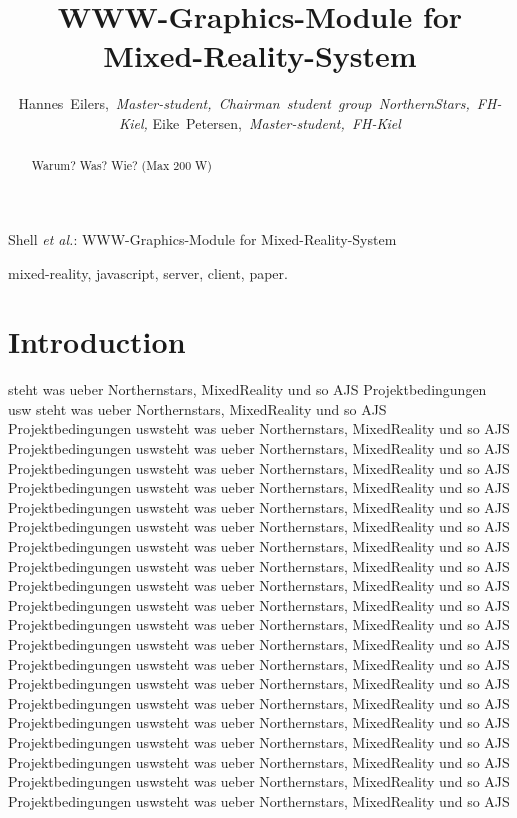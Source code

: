 \documentclass[journal]{IEEEtran}
\begin{document}
\title{WWW-Graphics-Module for Mixed-Reality-System}

\author{Hannes~Eilers,~\textit{Master-student,~Chairman~student~group~NorthernStars,~FH-Kiel,}
        Eike~Petersen,~\textit{Master-student,~FH-Kiel}}

%
{Shell \MakeLowercase{\textit{et al.}}: WWW-Graphics-Module for Mixed-Reality-System}

\maketitle

\begin{abstract}
	Warum? Was? Wie? (Max 200 W)
\end{abstract}
\begin{IEEEkeywords}
mixed-reality, javascript, server, client, paper.
\end{IEEEkeywords}

\section{Introduction}

 steht was ueber Northernstars, MixedReality und so AJS Projektbedingungen usw steht was ueber Northernstars, MixedReality und so AJS Projektbedingungen uswsteht was ueber Northernstars, MixedReality und so AJS Projektbedingungen uswsteht was ueber Northernstars, MixedReality und so AJS Projektbedingungen uswsteht was ueber Northernstars, MixedReality und so AJS Projektbedingungen uswsteht was ueber Northernstars, MixedReality und so AJS Projektbedingungen uswsteht was ueber Northernstars, MixedReality und so AJS Projektbedingungen uswsteht was ueber Northernstars, MixedReality und so AJS Projektbedingungen uswsteht was ueber Northernstars, MixedReality und so AJS Projektbedingungen uswsteht was ueber Northernstars, MixedReality und so AJS Projektbedingungen uswsteht was ueber Northernstars, MixedReality und so AJS Projektbedingungen uswsteht was ueber Northernstars, MixedReality und so AJS Projektbedingungen uswsteht was ueber Northernstars, MixedReality und so AJS Projektbedingungen uswsteht was ueber Northernstars, MixedReality und so AJS Projektbedingungen uswsteht was ueber Northernstars, MixedReality und so AJS Projektbedingungen uswsteht was ueber Northernstars, MixedReality und so AJS Projektbedingungen uswsteht was ueber Northernstars, MixedReality und so AJS Projektbedingungen uswsteht was ueber Northernstars, MixedReality und so AJS Projektbedingungen uswsteht was ueber Northernstars, MixedReality und so AJS Projektbedingungen uswsteht was ueber Northernstars, MixedReality und so AJS Projektbedingungen uswsteht was ueber Northernstars, MixedReality und so AJS Projektbedingungen uswsteht was ueber Northernstars, MixedReality und so AJS 
\end{document}
